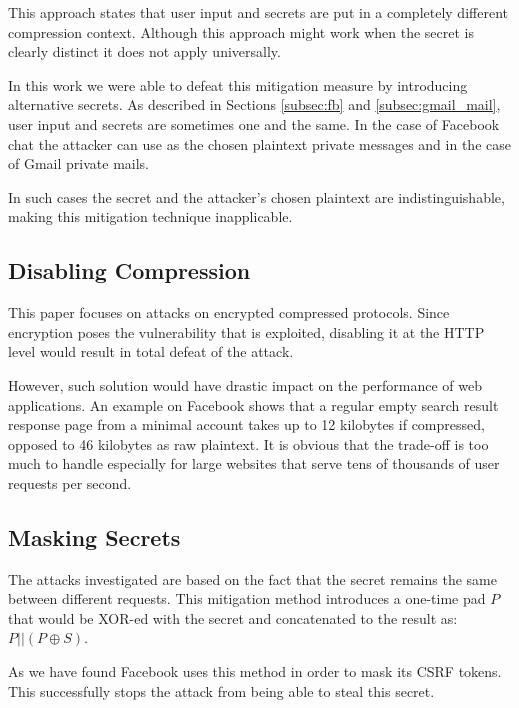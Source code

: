 This approach states that user input and secrets are put in a completely
different compression context. Although this approach might work when the secret
is clearly distinct it does not apply universally.

In this work we were able to defeat this mitigation measure by introducing
alternative secrets. As described in Sections \ref{subsec:fb} and
\ref{subsec:gmail_mail}, user input and secrets are sometimes one and the same.
In the case of Facebook chat the attacker can use as the chosen plaintext
private messages and in the case of Gmail private mails.

In such cases the secret and the attacker's chosen plaintext are
indistinguishable, making this mitigation technique inapplicable.

\subsection{Disabling Compression}

This paper focuses on attacks on encrypted compressed protocols. Since
encryption poses the vulnerability that is exploited, disabling it at the HTTP
level would result in total defeat of the attack.

However, such solution would have drastic impact on the performance of web
applications. An example on Facebook shows that a regular empty search result
response page from a minimal account takes up to 12 kilobytes if compressed,
opposed to 46 kilobytes as raw plaintext. It is obvious that the trade-off is
too much to handle especially for large websites that serve tens of thousands
of user requests per second.

\subsection{Masking Secrets}

The attacks investigated are based on the fact that the secret remains the same
between different requests. This mitigation method introduces a one-time pad
\begin{math}P\end{math} that would be XOR-ed with the secret and concatenated
to the result as: \begin{math}P||(P \oplus S)\end{math}.

As we have found Facebook uses this method in order to mask its CSRF tokens.
This successfully stops the attack from being able to steal this secret.

